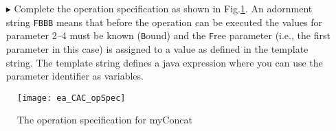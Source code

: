 \begin{itemize}
\item[$\blacktriangleright$] Complete the operation specification as shown in Fig.\ref{ea_CAC_opSpec}. An adornment string \texttt{FBBB} means that before the operation can be executed the values for parameter 2--4 must be known (\texttt{B}ound) and the \texttt{F}ree parameter (i.e., the first parameter in this case) is assigned to a value as defined in the template string. The template string defines a java expression where you can use the parameter identifier as variables. 

\end{itemize}
\begin{figure}[htbp]
\begin{center}
  \texttt{[image: ea\_CAC\_opSpec]}
  \caption{The operation specification for myConcat}  
  \label{ea_CAC_opSpec}
\end{center}
\end{figure}
   
